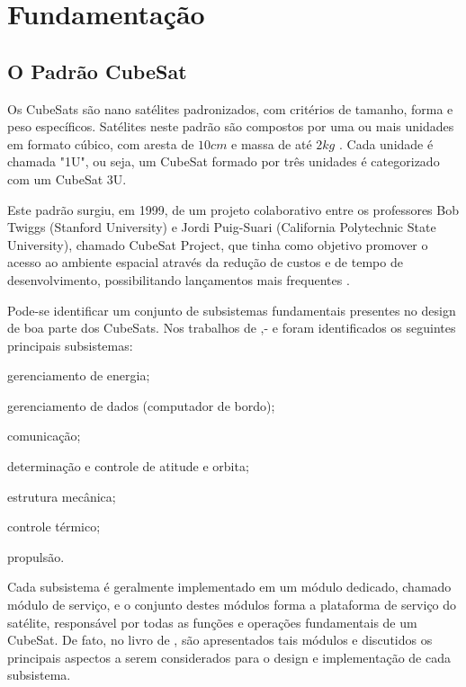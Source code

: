 \chapter{Fundamentação}\label{cap:fundamentacao}

\section{O Padrão CubeSat}\label{sec:cubesats}

Os CubeSats são nano satélites padronizados, com critérios de tamanho, forma e peso específicos.
Satélites neste padrão são compostos por uma ou mais unidades em formato cúbico, com aresta de \(10cm\) e massa de até \(2kg\) \cite{cds}.
Cada unidade é chamada "1U", ou seja, um CubeSat formado por três unidades é categorizado com um CubeSat 3U.

Este padrão surgiu, em 1999, de um projeto colaborativo entre os professores Bob Twiggs (Stanford University) e Jordi Puig-Suari (California Polytechnic State University), chamado CubeSat Project, que tinha como objetivo promover o acesso ao ambiente espacial através da redução de custos e de tempo de desenvolvimento, possibilitando lançamentos mais frequentes \cite{cds}.

Pode-se identificar um conjunto de subsistemas fundamentais presentes no design de boa parte dos 
CubeSats. Nos trabalhos de \textcite{tailoring-ecss-nanosat},- \textcite{survey-nanosat-missions-2010} e \textcite{reliability-of-cubesats} foram identificados os seguintes principais subsistemas:
\begin{alineas}
    \item gerenciamento de energia;
    \item gerenciamento de dados (computador de bordo);
    \item comunicação;
    \item determinação e controle de atitude e orbita;
    \item estrutura mecânica;
    \item controle térmico;
    \item propulsão.
\end{alineas}

Cada subsistema é geralmente implementado em um módulo dedicado, chamado módulo de serviço, e o conjunto destes módulos forma a plataforma de serviço do satélite, responsável por todas as funções e operações fundamentais de um CubeSat.
De fato,  no livro de \textcite{cappelletti_2020}, são apresentados tais módulos e discutidos os principais aspectos a serem considerados para o design e implementação de cada subsistema.

